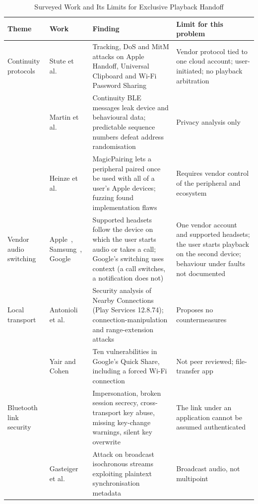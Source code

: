 \documentclass[conference]{IEEEtran}
\begin{document}
\begin{table}[t]
\caption{Surveyed Work and Its Limits for Exclusive Playback Handoff}
\label{tab:survey}
\centering
\footnotesize
\begin{tabularx}{\textwidth}{@{}L{2.2cm}L{3.4cm}YY@{}}
\toprule
\textbf{Theme} & \textbf{Work} & \textbf{Finding} & \textbf{Limit for this problem} \\
\midrule
Continuity protocols & Stute et al.~\cite{stute2021} & Tracking, DoS and MitM attacks on Apple Handoff, Universal Clipboard and Wi-Fi Password Sharing & Vendor protocol tied to one cloud account; user-initiated; no playback arbitration \\
 & Martin et al.~\cite{martin2019} & Continuity BLE messages leak device and behavioural data; predictable sequence numbers defeat address randomisation & Privacy analysis only \\
 & Heinze et al.~\cite{heinze2020} & MagicPairing lets a peripheral paired once be used with all of a user's Apple devices; fuzzing found implementation flaws & Requires vendor control of the peripheral and ecosystem \\
\midrule
Vendor audio switching & Apple~\cite{applesw}, Samsung~\cite{samsungsw}, Google~\cite{googlesw,fastpair} & Supported headsets follow the device on which the user starts audio or takes a call; Google's switching uses context (a call switches, a notification does not) & One vendor account and supported headsets; the user starts playback on the second device; behaviour under faults not documented \\
\midrule
Local transport & Antonioli et al.~\cite{antonioli2019} & Security analysis of Nearby Connections (Play Services 12.8.74); connection-manipulation and range-extension attacks & Proposes no countermeasures \\
 & Yair and Cohen~\cite{quickshell2024} & Ten vulnerabilities in Google's Quick Share, including a forced Wi-Fi connection & Not peer reviewed; file-transfer app \\
\midrule
Bluetooth link security & \cite{bias2020,bluffs2023,blurtooth2020,happymitm2021,stealtooth2025} & Impersonation, broken session secrecy, cross-transport key abuse, missing key-change warnings, silent key overwrite & The link under an application cannot be assumed authenticated \\
 & Gasteiger et al.~\cite{bison2023} & Attack on broadcast isochronous streams exploiting plaintext synchronisation metadata & Broadcast audio, not multipoint \\

\end{tabularx}
\end{table}
\end{document}
